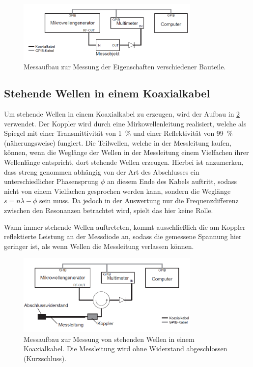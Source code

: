 \documentclass[
	a4paper,
	12pt,
	pagesize,
	ngerman
]{scrartcl}
\begin{document}
	\begin{figure}[H]
		\includegraphics[width=0.8\textwidth]{img/aufbau_bauteile.png}
		\centering
		\caption{
		 	Messaufbau zur Messung der Eigenschaften verschiedener Bauteile. \cite{Anleitung}
		}
		\label{fig_aufbau_bauteile}
		\centering
	\end{figure}

	\subsection{Stehende Wellen in einem Koaxialkabel}

	Um stehende Wellen in einem Koaxialkabel zu erzeugen, wird der Aufbau in \cref{fig_aufbau_resonanzen} verwendet.
	Der Koppler wird durch eine Mirkowellenleitung realisiert, welche als Spiegel mit einer Transmittivität von \SI{1}{\percent} und einer Reflektivität von \SI{99}{\percent} (näherungsweise) fungiert.
	Die Teilwellen, welche in der Messleitung laufen, können, wenn die Weglänge der Wellen in der Messleitung einem Vielfachen ihrer Wellenlänge entspricht, dort stehende Wellen erzeugen.
	Hierbei ist anzumerken, dass streng genommen abhängig von der Art des Abschlusses ein unterschiedlicher Phasensprung $\phi$ an diesem Ende des Kabels auftritt, sodass nicht von einem Vielfachen gesprochen werden kann, sondern die Weglänge $s = n\lambda - \phi$ sein muss.
	Da jedoch in der Auswertung nur die Frequenzdifferenz zwischen den Resonanzen betrachtet wird, spielt das hier keine Rolle.

	Wann immer stehende Wellen auftreteten, kommt ausschließlich die am Koppler reflektierte Leistung an der Messdiode an, sodass die gemessene Spannung hier geringer ist, als wenn Wellen die Messleitung verlassen können.

	\begin{figure}[H]
		\includegraphics[width=0.8\textwidth]{img/aufbau_resonanzen.png}
		\centering
		\caption{
		 	Messaufbau zur Messung von stehenden Wellen in einem Koaxialkabel. Die Messleitung wird ohne Widerstand abgeschlossen (Kurzschluss). \cite{Anleitung}
		}
		\label{fig_aufbau_resonanzen}
		\centering
	\end{figure}
\end{document}
